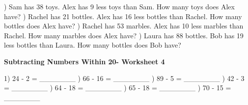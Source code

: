 \documentclass{article}%
\begin{document}
\newline%
\newline%
) Sam has 38 toys. Alex has 9 less toys than Sam. How many toys does Alex have?%
\newline%
\newline%
) Rachel has 21 bottles. Alex has 16 less bottles than Rachel. How many bottles does Alex have?%
\newline%
\newline%
) Rachel has 53 marbles. Alex has 10 less marbles than Rachel. How many marbles does Alex have?%
\newline%
\newline%
) Laura has 88 bottles. Bob has 19 less bottles than Laura. How many bottles does Bob have?%
\newline%
\newline%
\newline%
\pagebreak%
\large%
\begin{center}%
\textbf{Subtracting Numbers Within 20- Worksheet 4}%
\newline%
\newline%
\newline%
\end{center} \normalsize%
1) 24 {-} 2 = \_\_\_\_\_\_\_%
\newline%
\newline%
) 66 {-} 16 = \_\_\_\_\_\_\_%
\newline%
\newline%
) 89 {-} 5 = \_\_\_\_\_\_\_%
\newline%
\newline%
) 42 {-} 3 = \_\_\_\_\_\_\_%
\newline%
\newline%
) 64 {-} 18 = \_\_\_\_\_\_\_%
\newline%
\newline%
) 65 {-} 18 = \_\_\_\_\_\_\_%
\newline%
\newline%
) 70 {-} 15 = \_\_\_\_\_\_\_%
\newline%
\end{document}
